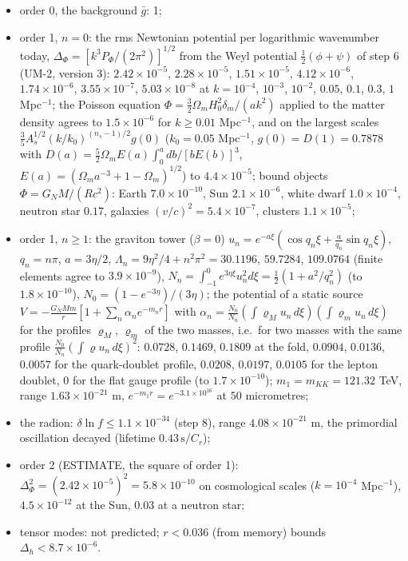 \documentclass[
  10pt,
]{article}
\providecommand{\tightlist}{%
  \setlength{\itemsep}{0pt}\setlength{\parskip}{0pt}}
\begin{document}
\begin{itemize}
\tightlist
\item
  order 0, the background \(\bar g\): 1;
\item
  order 1, \(n = 0\): the rms Newtonian potential per logarithmic
  wavenumber today, \(\Delta_\Phi = [k^3P_\Phi/(2\pi^2)]^{1/2}\) from
  the Weyl potential \(\frac12(\phi + \psi)\) of step 6 (UM-2, version
  3): \(2.42\times10^{-5}\), \(2.28\times10^{-5}\),
  \(1.51\times10^{-5}\), \(4.12\times10^{-6}\), \(1.74\times10^{-6}\),
  \(3.55\times10^{-7}\), \(5.03\times10^{-8}\) at \(k = 10^{-4}\),
  \(10^{-3}\), \(10^{-2}\), \(0.05\), \(0.1\), \(0.3\), \(1\)
  Mpc\(^{-1}\); the Poisson equation
  \(\Phi = \frac32\Omega_mH_0^2\delta_m/(ak^2)\) applied to the matter
  density agrees to \(1.5\times10^{-6}\) for \(k \ge 0.01\)
  Mpc\(^{-1}\), and on the largest scales
  \(\frac35A_s^{1/2}(k/k_0)^{(n_s - 1)/2}g(0)\) (\(k_0 = 0.05\)
  Mpc\(^{-1}\), \(g(0) = D(1) = 0.7878\) with
  \(D(a) = \frac52\Omega_mE(a)\int_0^a db/[bE(b)]^3\),
  \(E(a) = (\Omega_ma^{-3} + 1 - \Omega_m)^{1/2}\)) to
  \(4.4\times10^{-5}\); bound objects \(\Phi = G_NM/(Rc^2)\): Earth
  \(7.0\times10^{-10}\), Sun \(2.1\times10^{-6}\), white dwarf
  \(1.0\times10^{-4}\), neutron star \(0.17\), galaxies
  \((v/c)^2 = 5.4\times10^{-7}\), clusters \(1.1\times10^{-5}\);
\item
  order 1, \(n \ge 1\): the graviton tower (\(\beta = 0\))
  \(u_n = e^{-a\xi}(\cos q_n\xi + \frac{a}{q_n}\sin q_n\xi)\),
  \(q_n = n\pi\), \(a = 3\eta/2\),
  \(\Lambda_n = 9\eta^2/4 + n^2\pi^2 = 30.1196\), \(59.7284\),
  \(109.0764\) (finite elements agree to \(3.9\times10^{-9}\)),
  \(N_n = \int_{-1}^0e^{3\eta\xi}u_n^2d\xi = \frac12(1 + a^2/q_n^2)\)
  (to \(1.8\times10^{-10}\)), \(N_0 = (1 - e^{-3\eta})/(3\eta)\); the
  potential of a static source
  \(V = -\frac{G_NMm}{r}[1 + \sum_n\alpha_ne^{-m_nr}]\) with
  \(\alpha_n = \frac{N_0}{N_n}(\int\varrho_Mu_n\,d\xi)(\int\varrho_mu_n\,d\xi)\)
  for the profiles \(\varrho_M\), \(\varrho_m\) of the two masses,
  i.e.~for two masses with the same profile
  \(\frac{N_0}{N_n}(\int\varrho u_n\,d\xi)^2\): \(0.0728\), \(0.1469\),
  \(0.1809\) at the fold, \(0.0904\), \(0.0136\), \(0.0057\) for the
  quark-doublet profile, \(0.0208\), \(0.0197\), \(0.0105\) for the
  lepton doublet, \(0\) for the flat gauge profile (to
  \(1.7\times10^{-10}\)); \(m_1 = m_{KK} = 121.32\) TeV, range
  \(1.63\times10^{-21}\) m, \(e^{-m_1r} = e^{-3.1\times10^{16}}\) at
  \(50\) micrometres;
\item
  the radion: \(\delta\ln f \le 1.1\times10^{-34}\) (step 8), range
  \(4.08\times10^{-21}\) m, the primordial oscillation decayed (lifetime
  \(0.43\,\text{s}/C_r\));
\item
  order 2 (ESTIMATE, the square of order 1):
  \(\Delta_\Phi^2 = (2.42\times10^{-5})^2 = 5.8\times10^{-10}\) on
  cosmological scales (\(k = 10^{-4}\) Mpc\(^{-1}\)),
  \(4.5\times10^{-12}\) at the Sun, \(0.03\) at a neutron star;
\item
  tensor modes: not predicted; \(r < 0.036\) (from memory) bounds
  \(\Delta_h < 8.7\times10^{-6}\).
\end{itemize}
\end{document}
